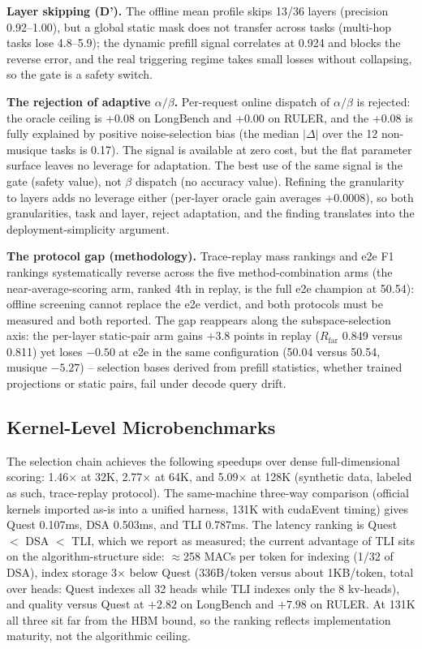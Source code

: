 \documentclass[11pt]{article}
\begin{document}
\textbf{Layer skipping (D').} The offline mean profile skips 13/36 layers (precision 0.92--1.00), but a global static mask does not transfer across tasks (multi-hop tasks lose 4.8--5.9); the dynamic prefill signal correlates at 0.924 and blocks the reverse error, and the real triggering regime takes small losses without collapsing, so the gate is a safety switch.

\textbf{The rejection of adaptive $\alpha/\beta$.} Per-request online dispatch of $\alpha/\beta$ is rejected: the oracle ceiling is +0.08 on LongBench and +0.00 on RULER, and the +0.08 is fully explained by positive noise-selection bias (the median $|\Delta|$ over the 12 non-musique tasks is 0.17). The signal is available at zero cost, but the flat parameter surface leaves no leverage for adaptation. The best use of the same signal is the gate (safety value), not $\beta$ dispatch (no accuracy value). Refining the granularity to layers adds no leverage either (per-layer oracle gain averages +0.0008), so both granularities, task and layer, reject adaptation, and the finding translates into the deployment-simplicity argument.

\textbf{The protocol gap (methodology).} Trace-replay mass rankings and e2e F1 rankings systematically reverse across the five method-combination arms (the near-average-scoring arm, ranked 4th in replay, is the full e2e champion at 50.54): offline screening cannot replace the e2e verdict, and both protocols must be measured and both reported. The gap reappears along the subspace-selection axis: the per-layer static-pair arm gains $+3.8$ points in replay ($R_\mathrm{far}$ 0.849 versus 0.811) yet loses $-0.50$ at e2e in the same configuration (50.04 versus 50.54, musique $-5.27$) -- selection bases derived from prefill statistics, whether trained projections or static pairs, fail under decode query drift.

\subsection{Kernel-Level Microbenchmarks}

The selection chain achieves the following speedups over dense full-dimensional scoring: 1.46$\times$ at 32K, 2.77$\times$ at 64K, and 5.09$\times$ at 128K (synthetic data, labeled as such, trace-replay protocol). The same-machine three-way comparison (official kernels imported as-is into a unified harness, 131K with cudaEvent timing) gives Quest 0.107ms, DSA 0.503ms, and TLI 0.787ms. The latency ranking is Quest $<$ DSA $<$ TLI, which we report as measured; the current advantage of TLI sits on the algorithm-structure side: $\approx$258 MACs per token for indexing (1/32 of DSA), index storage 3$\times$ below Quest (336B/token versus about 1KB/token, total over heads: Quest indexes all 32 heads while TLI indexes only the 8 kv-heads), and quality versus Quest at $+2.82$ on LongBench and $+7.98$ on RULER. At 131K all three sit far from the HBM bound, so the ranking reflects implementation maturity, not the algorithmic ceiling.
\end{document}
